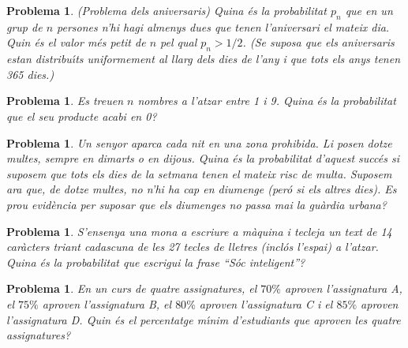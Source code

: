 \documentclass[11pt]{article}
\newcounter{prbcont}
\newtheorem{problema}[prbcont]{Problema}
\begin{document}
\begin{problema}
(Problema dels aniversaris) Quina \'es la probabilitat $p_n$ que en un grup de $n$ persones n'hi
hagi almenys dues que tenen l'aniversari el mateix dia. Quin \'es el valor m\'es petit de $n$
pel qual $p_n > 1/2$. (Se suposa que els aniversaris estan distribu\'{\i}ts uniformement al llarg dels dies de l'any i que tots els anys tenen 365 dies.)
\end{problema}


\begin{problema}
Es treuen $n$ nombres a l'atzar entre 1 i 9. Quina \'es la probabilitat que el seu producte
acabi en 0?
\end{problema}

\begin{problema}
Un senyor aparca cada nit en una zona prohibida. Li posen dotze multes, sempre en
dimarts o en dijous. Quina \'es la probabilitat d'aquest succ\'es si suposem que tots els
dies de la setmana tenen el mateix risc de multa. Suposem ara que, de dotze multes, no
n'hi ha cap en diumenge (per\'o si els altres dies). Es prou evid\`encia per suposar que els
diumenges no passa mai la gu\`ardia urbana?
\end{problema}

\begin{problema}
S'ensenya una mona a escriure a m\`aquina i tecleja un text de 14 car\`acters triant cadascuna
de les 27 tecles de lletres (incl\'os l'espai) a l'atzar. Quina \'es la probabilitat que escrigui
la frase ``S\'oc inteligent''?
\end{problema}

\begin{problema}
En un curs de quatre assignatures, el $70\%$ aproven l'assignatura A, el $75\%$ aproven l'assignatura B, el $80\%$ aproven l'assignatura C i el $85\%$ aproven l'assignatura D. Quin \'es el percentatge m\'{\i}nim d'estudiants que aproven les quatre assignatures?
\end{problema}


\end{document}
